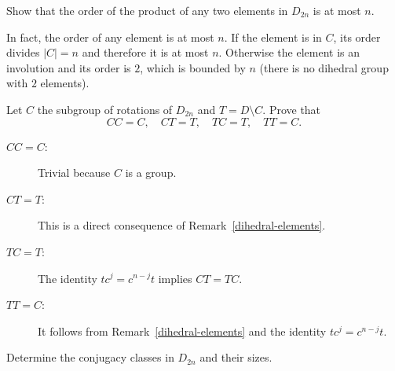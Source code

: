 \begin{probl}
    Show that the order of the product of any two elements in $D_{2n}$ is at most $n$.
\end{probl}

\begin{solution} In fact, the order of any element is at most $n$. If the element is in $C$, its order divides $|C|=n$ and therefore it is at most $n$. Otherwise the element is an involution and its order is $2$, which is bounded by $n$ (there is no dihedral group with $2$ elements).  \end{solution}

\begin{probl}\label{chat-2.B.5}
    Let $C$ the subgroup of rotations of $D_{2n}$ and $T=D\setminus C$. Prove that
    $$
        CC=C,\quad CT=T,\quad TC=T,\quad TT=C.
    $$
\end{probl}

\begin{solution}
\begin{description}
    \item[\rm$CC=C$:] Trivial because $C$ is a group.
    \item[\rm$CT=T$:] This is a direct consequence of Remark~\ref{dihedral-elements}.
    \item[\rm$TC=T$:] The identity $tc^j=c^{n-j}t$ implies $CT=TC$.
    \item[\rm$TT=C$:] It follows from Remark~\ref{dihedral-elements} and the identity $tc^j=c^{n-j}t$.
\end{description}
\end{solution}

\begin{probl}\label{chat-2.B.6}
    Determine the conjugacy classes in $D_{2n}$ and their sizes.
\end{probl}

